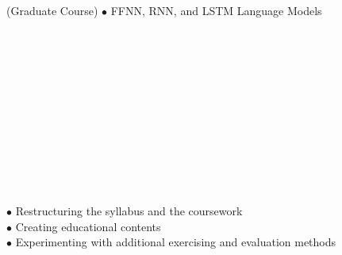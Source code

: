 \documentclass[]{rahulworld-resume}
\begin{document}
\begin{minipage}{0.16\textwidth} %
	\begin{minipage}{0.52\textwidth}
	\end{minipage}
	\begin{minipage}{0.42\textwidth}
	\end{minipage}
\end{minipage}
\hfill
\begin{minipage}{0.83\textwidth\vspace{6pt}}
	 \normalfont\normalsize (Graduate Course)
	\normalfont\normalsize
	$\bullet$ FFNN, RNN, and LSTM Language Models
\end{minipage}\\
\begin{minipage}{0.16\textwidth} %
	\begin{minipage}{0.52\textwidth}
		\\
		\\
		\\
		\\
	\end{minipage}
	\begin{minipage}{0.42\textwidth}
		\\
		\\
		\\
		\\
	\end{minipage}
\end{minipage}
\hfill
\begin{minipage}{0.83\textwidth\vspace{6pt}}
	\normalfont\normalsize
	$\bullet$ Restructuring the syllabus and the coursework\\
	$\bullet$ Creating educational contents\\
	$\bullet$ Experimenting with additional exercising and evaluation methods
\end{minipage}\\
\end{document}
